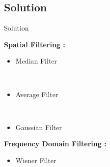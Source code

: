 \documentclass{beamer}
\begin{document}
		
		
		



\subsection{Solution}

\begin{frame}{Solution}

\textbf{Spatial Filtering :}
\begin{itemize}
\vspace{0.3cm}

\item Median Filter

\

\item Average Filter

\

\item Gaussian Filter
\end{itemize}	
\vspace{1cm}
	
	
	
\textbf{Frequency Domain Filtering :}
\begin{itemize}
\vspace{0.3cm}

\item Wiener Filter
\end{itemize}
\end{frame}
\end{document}
